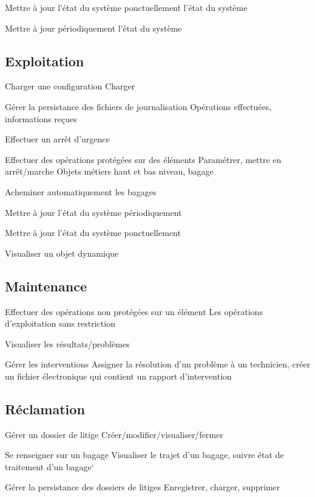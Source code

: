 \nBesoin
{Mettre à jour l'état du système ponctuellement l'état du système}
{}
{}

{}
{}

\nBesoin
{Mettre à jour périodiquement l'état du système}
{}
{}

\subsection{Exploitation}
\setcounter{cntBesoins}{1}

\nBesoin
{Charger une configuration}
{}
{Charger}

\nBesoin
{Gérer la persistance des fichiers de journalisation}
{Opérations effectuées, informations reçues}
{}

\nBesoin
{Effectuer un arrêt d'urgence}
{}{}

\nBesoin
{Effectuer des opérations protégées sur des éléments}
{Paramétrer, mettre en arrêt/marche}
{Objets métiers haut et bas niveau, bagage}

\nBesoin
{Acheminer automatiquement les bagages}
{}{}

\nBesoin
{Mettre à jour l'état du système périodiquement}
{}{}

\nBesoin
{Mettre à jour l'état du système ponctuellement}
{}{}

\nBesoin
{Visualiser un objet dynamique}
{}
{}

\subsection{Maintenance}
\setcounter{cntBesoins}{1}

\nBesoin
{Effectuer des opérations non protégées sur un élément}
{}
{Les opérations d'exploitation sans restriction}

\nBesoin
{Visualiser les résultats/problèmes}
{}{}

\nBesoin
{Gérer les interventions}
{}
{Assigner la résolution d'un problème à un technicien, créer un fichier électronique qui contient un rapport d'intervention}

\subsection{Réclamation}
\setcounter{cntBesoins}{1}

\nBesoin
{Gérer un dossier de  litige}
{}
{Créer/modifier/visualiser/fermer}

\nBesoin
{Se renseigner sur un bagage}
{}
{Visualiser le trajet d'un bagage,  suivre état de traitement d'un bagage}`

\nBesoin
{Gérer la persistance des dossiers de litiges}
{}
{Enregistrer, charger, supprimer}
